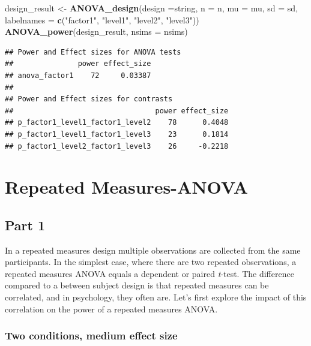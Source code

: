 \documentclass[]{book}
\newenvironment{Shaded}{\begin{snugshade}}{\end{snugshade}}
\newcommand{\DataTypeTok}[1]{\textcolor[rgb]{0.13,0.29,0.53}{#1}}
\newcommand{\KeywordTok}[1]{\textcolor[rgb]{0.13,0.29,0.53}{\textbf{#1}}}
\newcommand{\NormalTok}[1]{#1}
\newcommand{\StringTok}[1]{\textcolor[rgb]{0.31,0.60,0.02}{#1}}
\begin{document}
\begin{Shaded}
\begin{Highlighting}[]
\NormalTok{design_result <-}\StringTok{ }\KeywordTok{ANOVA_design}\NormalTok{(}\DataTypeTok{design =}\NormalTok{string,}
                   \DataTypeTok{n =}\NormalTok{ n, }
                   \DataTypeTok{mu =}\NormalTok{ mu, }
                   \DataTypeTok{sd =}\NormalTok{ sd, }
                   \DataTypeTok{labelnames =} \KeywordTok{c}\NormalTok{(}\StringTok{"factor1"}\NormalTok{, }\StringTok{"level1"}\NormalTok{, }\StringTok{"level2"}\NormalTok{, }\StringTok{"level3"}\NormalTok{))}
\KeywordTok{ANOVA_power}\NormalTok{(design_result, }\DataTypeTok{nsims =}\NormalTok{ nsims)}
\end{Highlighting}
\end{Shaded}

\begin{verbatim}
## Power and Effect sizes for ANOVA tests
##               power effect_size
## anova_factor1    72     0.03387
## 
## Power and Effect sizes for contrasts
##                                 power effect_size
## p_factor1_level1_factor1_level2    78      0.4048
## p_factor1_level1_factor1_level3    23      0.1814
## p_factor1_level2_factor1_level3    26     -0.2218
\end{verbatim}

\hypertarget{repeated-measures-anova}{%
\chapter{Repeated Measures-ANOVA}\label{repeated-measures-anova}}

\hypertarget{part-1}{%
\section{Part 1}\label{part-1}}

In a repeated measures design multiple observations are collected from the same participants. In the simplest case, where there are two repeated observations, a repeated measures ANOVA equals a dependent or paired \emph{t}-test. The difference compared to a between subject design is that repeated measures can be correlated, and in psychology, they often are. Let's first explore the impact of this correlation on the power of a repeated measures ANOVA.

\hypertarget{two-conditions-medium-effect-size}{%
\subsection{Two conditions, medium effect size}\label{two-conditions-medium-effect-size}}
\end{document}
